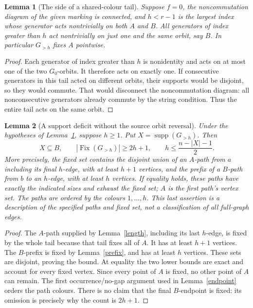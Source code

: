 \documentclass[11pt,a4paper]{article}
\newtheorem{lemma}{Lemma}
\begin{document}
\begin{lemma}[The side of a shared-colour tail]\label{side}
Suppose $f=0$, the noncommutation diagram of the given marking is
connected, and $h<r-1$ is the largest index whose generator acts
nontrivially on both $A$ and $B$. All generators of index greater
than $h$ act nontrivially on just one and the same orbit, say $B$.
In particular $G_{>h}$ fixes $A$ pointwise.
\end{lemma}
\begin{proof}
Each generator of index greater than $h$ is nonidentity and acts on
at most one of the two $G_0$-orbits. It therefore acts on exactly
one. If consecutive generators in this tail acted on different
orbits, their supports would be disjoint, so they would commute.
That would disconnect the noncommutation diagram: all
nonconsecutive generators already commute by the string condition.
Thus the entire tail acts on the same orbit.
\end{proof}

\begin{lemma}[A support deficit without the source orbit reversal]
\label{deficit}
Under the hypotheses of Lemma~\ref{side}, suppose $h\ge1$.
Put $X=\operatorname{supp}(G_{>h})$. Then
\[
 X\subseteq B,\qquad |\operatorname{Fix}(G_{>h})|\ge2h+1,
 \qquad h\le\frac{n-|X|-1}{2}.
\]
More precisely, the fixed set contains the disjoint union of
an $A$-path from $a$ including its final $h$-edge, with at least
$h+1$ vertices, and the prefix of a $B$-path from $b$ to an
$h$-edge, with at least $h$ vertices.
If equality holds, these paths have exactly the indicated sizes
and exhaust the fixed set; $A$ is the first path's vertex set.
The paths are ordered by the colours $1,\ldots,h$.
This last assertion is a description of the specified paths and
fixed set, not a classification of all full-graph edges.
\end{lemma}
\begin{proof}
The $A$-path supplied by Lemma~\ref{length}, including its last
$h$-edge, is fixed by the whole tail because that tail fixes all
of $A$. It has at least $h+1$ vertices. The $B$-prefix is fixed
by Lemma~\ref{prefix}, and has at least $h$ vertices. These sets
are disjoint, proving the bound. At equality the two lower bounds
are exact and account for every fixed vertex. Since every point
of $A$ is fixed, no other point of $A$ can remain. The first
occurrence/no-gap argument used in Lemma~\ref{endpoint} orders
the path colours. There is no claim that the final $B$-endpoint
is fixed: its omission is precisely why the count is $2h+1$.
\end{proof}
\end{document}
